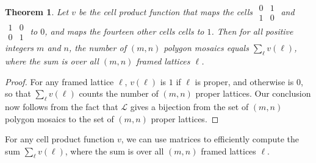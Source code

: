 \documentclass[12pt]{article}
\theoremstyle{plain}
\newtheorem{thm}{Theorem}[section]
\theoremstyle{remark}
\theoremstyle{definition}
\theoremstyle{remark}
\theoremstyle{definition}
\begin{document}
\begin{thm}
Let $v$ be the cell product function that maps the cells $\begin{smallmatrix}0 & 1\\ 1 & 0 \end{smallmatrix}$ and $\begin{smallmatrix}1 & 0\\0 & 1 \end{smallmatrix}$ to $0$, and maps the fourteen other cells cells to $1$. Then for all positive integers $m$ and $n$, the number of $\left(m,n\right)$ polygon mosaics equals $\sum_{\ell}v\left(\ell\right)$, where the sum is over all $\left(m,n\right)$ framed lattices $\ell$.
\label{thm: sum of v for polygon mosaics}
\end{thm}

\begin{proof}
For any framed lattice $\ell$, $v\left(\ell\right)$ is $1$ if $\ell$ is proper, and otherwise is $0$, so that $\sum_{\ell}v\left(\ell\right)$ counts the number of $\left(m,n\right)$ proper lattices. Our conclusion now follows from the fact that $\mathscr{L}$ gives a bijection from the set of $\left(m,n\right)$ polygon mosaics to the set of $\left(m,n\right)$ proper lattices.
\end{proof}

For any cell product function $v$, we can use matrices to efficiently compute the sum $\sum_{\ell} v(\ell)$, where the sum is over all $(m,n)$ framed lattices $\ell$.
\end{document}
